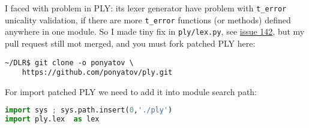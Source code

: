 I faced with problem in PLY: its lexer generator have problem with
\verb|t_error| unicality validation, if there are more \verb|t_error| functions
(or methods) defined anywhere in one module. So I made tiny fix in
\verb|ply/lex.py|, see
\href{http://github.com/dabeaz/ply/issues/142}{issue 142}, but my pull request
still mot merged, and you must fork patched PLY here:
\begin{lstlisting}
~/DLR$ git clone -o ponyatov \
	https://github.com/ponyatov/ply.git
\end{lstlisting}
For import patched PLY we need to add it into module search path:
\begin{lstlisting}[language=Python]
import sys ; sys.path.insert(0,'./ply')
import ply.lex  as lex
\end{lstlisting}



% 
